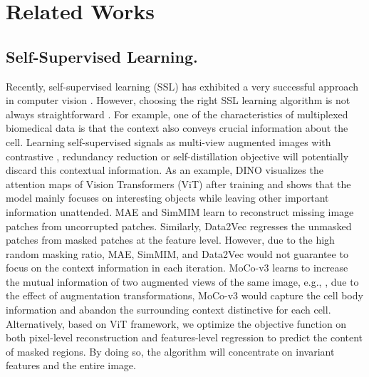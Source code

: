 \documentclass[10pt,twocolumn,letterpaper]{article}
\begin{document}
\section{Related Works}\label{sec:relatedwork}
\subsection{Self-Supervised Learning.} Recently, self-supervised learning (SSL) has exhibited a very successful approach in computer vision \cite{simclr,byol,moco,dino,mae,beit}. However, choosing the right SSL learning algorithm is not always straightforward \cite{ericsson2021well}. For example, one of the characteristics of multiplexed biomedical data is that the context also conveys crucial information about the cell. Learning self-supervised signals as multi-view augmented images with contrastive \cite{simclr,byol,moco,morency,completer}, redundancy reduction \cite{twins} or self-distillation \cite{dino} objective will potentially discard this contextual information. As an example, DINO \cite{dino} visualizes the attention maps of Vision Transformers (ViT) \cite{vit} after training and shows that the model mainly focuses on interesting objects while leaving other important information unattended. MAE \cite{mae} and SimMIM \cite{simmim} learn to reconstruct missing image patches from uncorrupted patches. Similarly, Data2Vec \cite{data2vec} regresses the unmasked patches from masked patches at the feature level. However, due to the high random masking ratio, MAE, SimMIM, and Data2Vec would not guarantee to focus on the context information in each iteration. MoCo-v3 \cite{mocov3} learns to increase the mutual information of two augmented views of the same image, e.g., , due to the effect of augmentation transformations, MoCo-v3 would capture the cell body information and abandon the surrounding context distinctive for each cell. Alternatively, based on ViT \cite{vit} framework, we optimize the objective function on both pixel-level reconstruction \cite{mae,simmim,beit} and features-level regression \cite{data2vec} to predict the content of masked regions. By doing so, the algorithm will concentrate on invariant features and the entire image.
\end{document}
